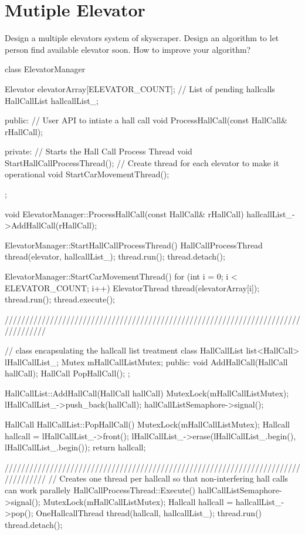 \section{Mutiple Elevator}
Design a multiple elevators system of skyscraper. Design an algorithm to let person find available elevator soon. How to improve your algorithm?

\begin{Code}
	class ElevatorManager{
		Elevator elevatorArray[ELEVATOR_COUNT];
		// List of pending hallcalls
		HallCallList hallcallList_;
		
		public:
		// User API to intiate a hall call
		void ProcessHallCall(const HallCall& rHallCall);
		
		private:
		// Starts the Hall Call Process Thread
		void StartHallCallProcessThread();
		// Create thread for each elevator to make it operational
		void StartCarMovementThread();
	};
	
	void ElevatorManager::ProcessHallCall(const HallCall& rHallCall){
		hallcallList_->AddHallCall(rHallCall);
	}
	
	ElevatorManager::StartHallCallProcessThread(){
		HallCallProcessThread thread(elevator, hallcallList_);
		thread.run();
		thread.detach();
	}
	
	ElevatorManager::StartCarMovementThread(){
		for (int i = 0; i < ELEVATOR_COUNT; i++){
			ElevatorThread thread(elevatorArray[i]);
			thread.run();
			thread.execute();
		}
	}
	
	
	//////////////////////////////////////////////////////////////////////////////////
	
	// class encapsulating the hallcall list treatment
	class HallCallList{
		list<HallCall> lHallCallList_;
		Mutex mHallCallListMutex;
		public:
		void AddHallCall(HallCall hallCall);
		HallCall PopHallCall();
	};
	
	HallCallList::AddHallCall(HallCall hallCall){
		MutexLock(mHallCallListMutex);
		lHallCallList_->push_back(hallCall);
		hallCallListSemaphore->signal();
	}
	
	HallCall HallCallList::PopHallCall(){
		MutexLock(mHallCallListMutex);
		Hallcall hallcall = lHallCallList_->front();
		lHallCallList_->erase(lHallCallList_.begin(), lHallCallList_.begin());
		return hallcall;
	}
	
	//////////////////////////////////////////////////////////////////////////////////
	// Creates one thread per hallcall so that non-interfering hall calls can work parallely
	HallCallProcessThread::Execute(){
		hallCallListSemaphore->signal();
		MutexLock(mHallCallListMutex);
		Hallcall hallcall = hallcallList_->pop();
		OneHallcallThread thread(hallcall, hallcallList_);
		thread.run()
		thread.detach();
	}
	

\end{Code}
